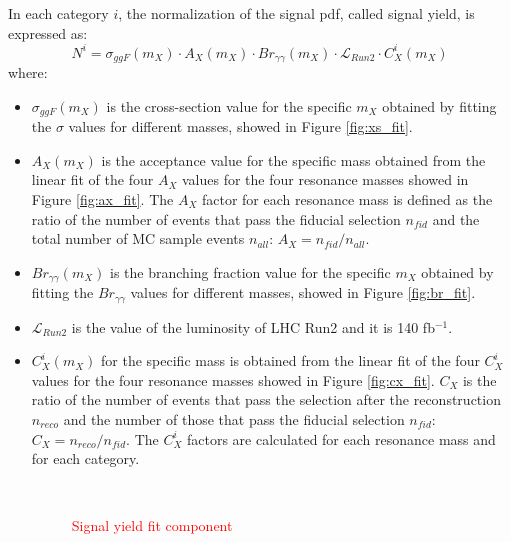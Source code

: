 \documentclass[a4paper, oneside, 11pt, openright]{book}
\begin{document}
 				In each category $i$, the normalization of the signal pdf, called signal yield, is expressed as:
 				\begin{equation}\label{eq:signal_yield}
 					N^i = \sigma_{ggF}(m_X) \cdot A_X(m_X) \cdot Br_{\gamma\gamma}(m_X) \cdot \mathcal{L}_{Run2} \cdot C_X^i(m_X)
 				\end{equation}
 				where:
 				\begin{itemize}
 					\item $\sigma_{ggF}(m_X)$ is the cross-section value for the specific $m_X$ obtained by fitting the $\sigma$ values for different masses, showed in Figure \ref{fig:xs_fit}.
 					\item $A_X(m_X)$ is the acceptance value for the specific mass obtained from the linear fit of the four $A_X$ values for the four resonance masses showed in Figure \ref{fig:ax_fit}. The $A_X$ factor for each resonance mass is defined as the ratio of the number of events that pass the fiducial selection $n_{fid}$ and the total number of MC sample events $n_{all}$: $A_X = n_{fid}/n_{all}$.
 					\item $Br_{\gamma\gamma}(m_X)$ is the branching fraction value for the specific $m_X$ obtained by fitting the $Br_{\gamma\gamma}$ values for different masses, showed in Figure \ref{fig:br_fit}.  
 					\item $\mathcal{L}_{Run2}$ is the value of the luminosity of LHC Run2 and it is 140 fb$^{-1}$.
 					\item $C_X^i(m_X)$ for the specific mass is obtained from the linear fit of the four $C_X^i$ values for the four resonance masses showed in Figure \ref{fig:cx_fit}. $C_X$ is the ratio of the number of events that pass the selection after the reconstruction $n_{reco}$ and the number of those that pass the fiducial selection $n_{fid}$: $C_X = n_{reco}/n_{fid}$. The $C_X^i$ factors are calculated for each resonance mass and for each category.
 				
 					\begin{figure}[h!]
 						\centering
 						\\
 						\caption{\textcolor{red}{Signal yield fit component}}
 						\label{fig:signal_yiels}
 					\end{figure}
 				\end{itemize}
 				
\end{document}
